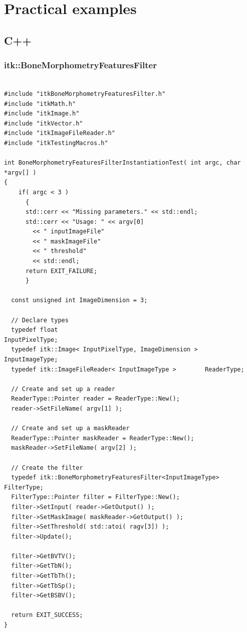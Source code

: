 \documentclass{InsightArticle}
\begin{document}
\newpage
\section{Practical examples}
\label{sec:examples}

\subsection{C++}
\label{sec:C++Ex}

\subsubsection{itk::BoneMorphometryFeaturesFilter}

\begin{verbatim}

#include "itkBoneMorphometryFeaturesFilter.h"
#include "itkMath.h"
#include "itkImage.h"
#include "itkVector.h"
#include "itkImageFileReader.h"
#include "itkTestingMacros.h"

int BoneMorphometryFeaturesFilterInstantiationTest( int argc, char *argv[] )
{
    if( argc < 3 )
      {
      std::cerr << "Missing parameters." << std::endl;
      std::cerr << "Usage: " << argv[0]
        << " inputImageFile"
        << " maskImageFile"
        << " threshold"
        << std::endl;
      return EXIT_FAILURE;
      }

  const unsigned int ImageDimension = 3;

  // Declare types
  typedef float                                         InputPixelType;
  typedef itk::Image< InputPixelType, ImageDimension >  InputImageType;
  typedef itk::ImageFileReader< InputImageType >        ReaderType;

  // Create and set up a reader
  ReaderType::Pointer reader = ReaderType::New();
  reader->SetFileName( argv[1] );

  // Create and set up a maskReader
  ReaderType::Pointer maskReader = ReaderType::New();
  maskReader->SetFileName( argv[2] );

  // Create the filter
  typedef itk::BoneMorphometryFeaturesFilter<InputImageType> FilterType;
  FilterType::Pointer filter = FilterType::New();
  filter->SetInput( reader->GetOutput() );
  filter->SetMaskImage( maskReader->GetOutput() );
  filter->SetThreshold( std::atoi( ragv[3]) );
  filter->Update();

  filter->GetBVTV();
  filter->GetTbN();
  filter->GetTbTh();
  filter->GetTbSp();
  filter->GetBSBV();
  
  return EXIT_SUCCESS;
}

\end{verbatim}
\normalsize
\end{document}
